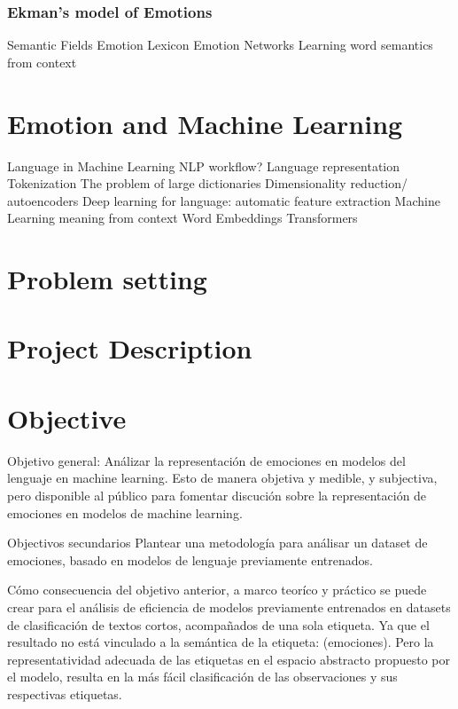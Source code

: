 
\subsubsection{Ekman's model of Emotions}\label{subs:Ekman's model of Emotions}

Semantic Fields
Emotion Lexicon
Emotion Networks
Learning word semantics from context


\section{Emotion and Machine Learning}\label{sec:Emotion and Machine Learning}
Language in Machine Learning
NLP workflow?
Language representation
Tokenization
The problem of large dictionaries
Dimensionality reduction/ autoencoders
Deep learning for language: automatic feature extraction
Machine Learning meaning from context
Word Embeddings
Transformers

\section{Problem setting}\label{sec:Problem setting}


\section{Project Description}\label{sec:Project Description}


\section{Objective}\label{sec:Objective}

Objetivo general:
Análizar la representación de emociones en modelos del lenguaje en machine learning. Esto de manera objetiva y medible, y subjectiva, pero disponible al público para fomentar discución sobre la representación de emociones en modelos de machine learning.

Objectivos secundarios
Plantear una metodología para análisar un dataset de emociones, basado en modelos de lenguaje previamente entrenados.

Cómo consecuencia del objetivo anterior, a marco teoríco y práctico se puede crear para el análisis de eficiencia de modelos previamente entrenados en datasets de clasificación de textos cortos, acompañados de una sola etiqueta. Ya que el resultado no está vinculado a la semántica de la etiqueta: (emociones). Pero la representatividad adecuada de las etiquetas en el espacio abstracto propuesto por el modelo, resulta en la más fácil clasificación de las observaciones y sus respectivas etiquetas.

